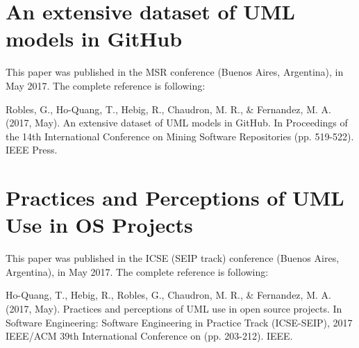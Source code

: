 \documentclass[a4paper, 12pt]{book}
\begin{document}

\section{An extensive dataset of UML models in GitHub}
\label{sec:paper-msr}
This paper was published in the MSR conference (Buenos Aires, Argentina), in May 2017. The complete reference is following:

Robles, G., Ho-Quang, T., Hebig, R., Chaudron, M. R., \& Fernandez, M. A. (2017, May). An extensive dataset of UML models in GitHub. In Proceedings of the 14th International Conference on Mining Software Repositories (pp. 519-522). IEEE Press.


\section{Practices and Perceptions of UML Use in OS Projects}
\label{sec:paper-icse}
This paper was published in the ICSE (SEIP track) conference (Buenos Aires, Argentina), in May 2017. The complete reference is following:

Ho-Quang, T., Hebig, R., Robles, G., Chaudron, M. R., \& Fernandez, M. A. (2017, May). Practices and perceptions of UML use in open source projects. In Software Engineering: Software Engineering in Practice Track (ICSE-SEIP), 2017 IEEE/ACM 39th International Conference on (pp. 203-212). IEEE.


\end{document}
